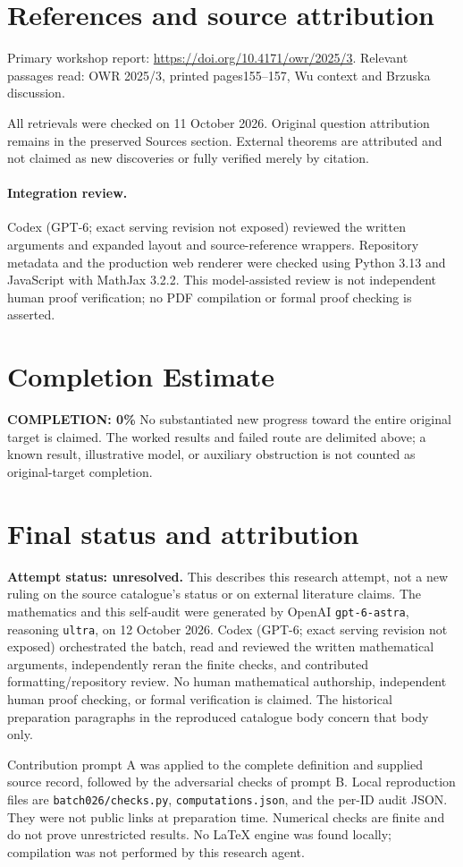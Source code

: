\documentclass[11pt]{article}
\begin{document}
\section{References and source attribution}
Primary workshop report: \url{https://doi.org/10.4171/owr/2025/3}. Relevant passages read: OWR 2025/3, printed pages155--157, Wu context and Brzuska discussion.

All retrievals were checked on 11 October 2026. Original question attribution remains in the preserved Sources section. External theorems are attributed and not claimed as new discoveries or fully verified merely by citation.


\paragraph{Integration review.} Codex (GPT-6; exact serving revision not exposed) reviewed the written arguments and expanded layout and source-reference wrappers. Repository metadata and the production web renderer were checked using Python 3.13 and JavaScript with MathJax 3.2.2. This model-assisted review is not independent human proof verification; no PDF compilation or formal proof checking is asserted.

\section{Completion Estimate}
\noindent\textbf{COMPLETION: 0\%}
No substantiated new progress toward the entire original target is claimed. The worked results and failed route are delimited above; a known result, illustrative model, or auxiliary obstruction is not counted as original-target completion.

\section{Final status and attribution}
\textbf{Attempt status: unresolved.} This describes this research attempt, not a new ruling on the source catalogue's status or on external literature claims.
The mathematics and this self-audit were generated by OpenAI \texttt{gpt-6-astra}, reasoning \texttt{ultra}, on 12 October 2026. Codex (GPT-6; exact serving revision not exposed) orchestrated the batch, read and reviewed the written mathematical arguments, independently reran the finite checks, and contributed formatting/repository review. No human mathematical authorship, independent human proof checking, or formal verification is claimed. The historical preparation paragraphs in the reproduced catalogue body concern that body only.

Contribution prompt A was applied to the complete definition and supplied source record, followed by the adversarial checks of prompt B. Local reproduction files are \texttt{batch026/checks.py}, \texttt{computations.json}, and the per-ID audit JSON. They were not public links at preparation time. Numerical checks are finite and do not prove unrestricted results. No LaTeX engine was found locally; compilation was not performed by this research agent.
\end{document}

